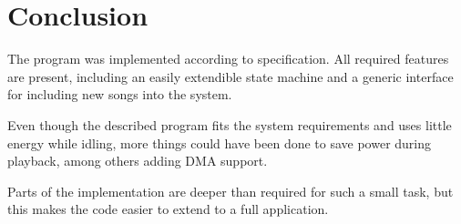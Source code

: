 \section{Conclusion}
The program was implemented according to specification. All required features are present, including an easily extendible state machine and a generic interface for including new songs into the system.

Even though the described program fits the system requirements and uses little energy while idling, more things could have been done to save power during playback, among others adding DMA support.

Parts of the implementation are deeper than required for such a small task, but this makes the code easier to extend to a full application.

